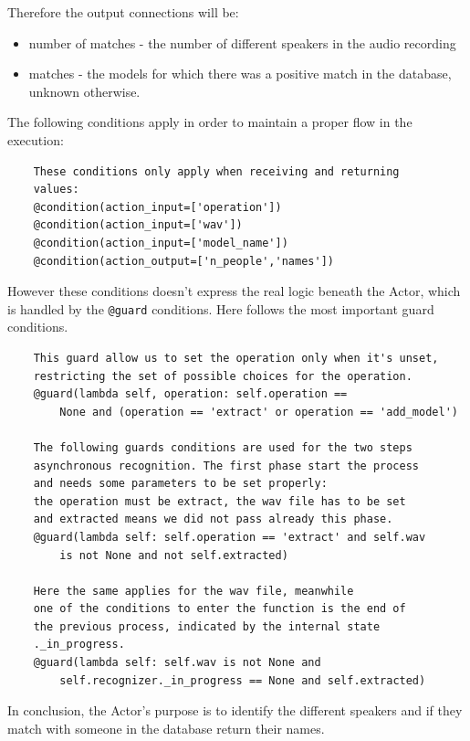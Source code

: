 Therefore the output connections will be:

\begin{itemize}
    \item number of matches - the number of different speakers in the audio recording
    \item matches - the models for which there was a positive match in the database, unknown otherwise.
\end{itemize}

The following conditions apply in order to maintain a proper flow in the execution:

\begin{verbatim}
    These conditions only apply when receiving and returning
    values:
    @condition(action_input=['operation'])
    @condition(action_input=['wav'])
    @condition(action_input=['model_name'])
    @condition(action_output=['n_people','names'])

\end{verbatim}

However these conditions doesn't express the real logic beneath the Actor, which
is handled by the \texttt{@guard} conditions. Here follows the most
important guard conditions.

\begin{verbatim}
    This guard allow us to set the operation only when it's unset,
    restricting the set of possible choices for the operation.
    @guard(lambda self, operation: self.operation ==
        None and (operation == 'extract' or operation == 'add_model')

    The following guards conditions are used for the two steps
    asynchronous recognition. The first phase start the process
    and needs some parameters to be set properly:
    the operation must be extract, the wav file has to be set
    and extracted means we did not pass already this phase.
    @guard(lambda self: self.operation == 'extract' and self.wav
        is not None and not self.extracted)

    Here the same applies for the wav file, meanwhile
    one of the conditions to enter the function is the end of
    the previous process, indicated by the internal state
    ._in_progress.
    @guard(lambda self: self.wav is not None and
        self.recognizer._in_progress == None and self.extracted)

\end{verbatim}

In conclusion, the Actor's purpose is to identify the different
speakers and if they match with someone in the database return
their names.

